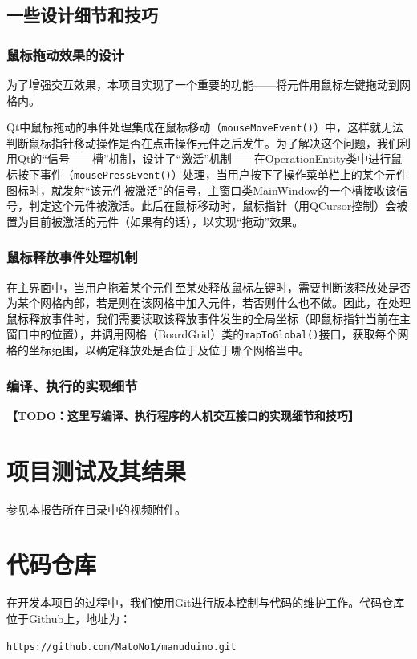\documentclass[UTF8]{ctexart}
\begin{document}
\subsection{一些设计细节和技巧}
\subsubsection{鼠标拖动效果的设计}
为了增强交互效果，本项目实现了一个重要的功能——将元件用鼠标左键拖动到网格内。\par
Qt中鼠标拖动的事件处理集成在鼠标移动（\texttt{mouseMoveEvent()}）中，这样就无法判断鼠标指针移动操作是否在点击操作元件之后发生。为了解决这个问题，我们利用Qt的“信号——槽”机制，设计了“激活”机制——在OperationEntity类中进行鼠标按下事件（\texttt{mousePressEvent()}）处理，当用户按下了操作菜单栏上的某个元件图标时，就发射“该元件被激活”的信号，主窗口类MainWindow的一个槽接收该信号，判定这个元件被激活。此后在鼠标移动时，鼠标指针（用QCursor控制）会被置为目前被激活的元件（如果有的话），以实现“拖动”效果。\par
\subsubsection{鼠标释放事件处理机制}
在主界面中，当用户拖着某个元件至某处释放鼠标左键时，需要判断该释放处是否为某个网格内部，若是则在该网格中加入元件，若否则什么也不做。因此，在处理鼠标释放事件时，我们需要读取该释放事件发生的全局坐标（即鼠标指针当前在主窗口中的位置），并调用网格（BoardGrid）类的\texttt{mapToGlobal()}接口，获取每个网格的坐标范围，以确定释放处是否位于及位于哪个网格当中。\par
\subsubsection{编译、执行的实现细节}
\textbf{\Large 【TODO：这里写编译、执行程序的人机交互接口的实现细节和技巧】}

\section{项目测试及其结果}
参见本报告所在目录中的视频附件。

\section{代码仓库}
在开发本项目的过程中，我们使用Git进行版本控制与代码的维护工作。代码仓库位于Github上，地址为：\par
\texttt{https://github.com/MatoNo1/manuduino.git}
\end{document}
